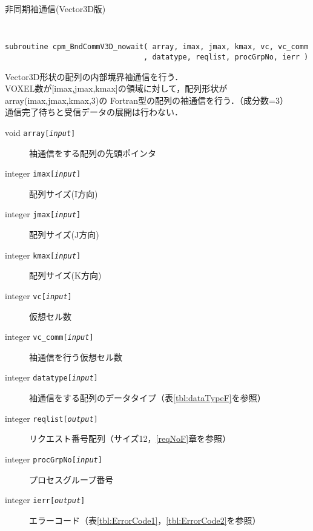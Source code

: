 \begin{spacing}{0.8}
\begin{itembox}[l]{非同期袖通信(Vector3D版)}
{\tt
\begin{verbatim}
subroutine cpm_BndCommV3D_nowait( array, imax, jmax, kmax, vc, vc_comm
                                , datatype, reqlist, procGrpNo, ierr )
\end{verbatim}
}
Vector3D形状の配列の内部境界袖通信を行う．\\
VOXEL数が[imax,jmax,kmax]の領域に対して，配列形状がarray(imax,jmax,kmax,3)の
Fortran型の配列の袖通信を行う．（成分数=3）\\
通信完了待ちと受信データの展開は行わない．
\begin{description}
\item[void    {\tt array[{\it input}]}] 袖通信をする配列の先頭ポインタ
\item[integer {\tt imax[{\it input}]}] 配列サイズ(I方向)
\item[integer {\tt jmax[{\it input}]}] 配列サイズ(J方向)
\item[integer {\tt kmax[{\it input}]}] 配列サイズ(K方向)
\item[integer {\tt vc[{\it input}]}] 仮想セル数
\item[integer {\tt vc\_comm[{\it input}]}] 袖通信を行う仮想セル数
\item[integer {\tt datatype[{\it input}]}] 袖通信をする配列のデータタイプ（表\ref{tbl:dataTypeF}を参照）
\item[integer {\tt reqlist[{\it output}]}] リクエスト番号配列（サイズ12，\ref{reqNoF}章を参照）
\item[integer {\tt procGrpNo[{\it input}]}] プロセスグループ番号
\item[integer {\tt ierr[{\it output}]}] エラーコード（表\ref{tbl:ErrorCode1}，\ref{tbl:ErrorCode2}を参照）
\end{description}
\end{itembox}\\
\end{spacing}

